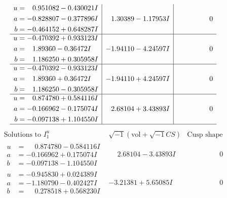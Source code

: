 \documentclass[1p]{elsarticle_modified}
\theoremstyle{definition}
\newcommand{\I}{\sqrt{-1}}
\begin{document}
$$\begin{array}{c|c|c}
\begin{aligned}
u &= \phantom{-}0.951082 - 0.430021 I \\
a &= -0.828807 - 0.377896 I \\
b &= -0.464152 + 0.648287 I\end{aligned}
 & \phantom{-}1.30389 - 1.17953 I & \phantom{-0.000000 } 0 \\ \hline\begin{aligned}
u &= -0.470392 + 0.933123 I \\
a &= \phantom{-}1.89360 - 0.36472 I \\
b &= \phantom{-}1.186250 + 0.305958 I\end{aligned}
 & -1.94110 - 4.24597 I & \phantom{-0.000000 } 0 \\ \hline\begin{aligned}
u &= -0.470392 - 0.933123 I \\
a &= \phantom{-}1.89360 + 0.36472 I \\
b &= \phantom{-}1.186250 - 0.305958 I\end{aligned}
 & -1.94110 + 4.24597 I & \phantom{-0.000000 } 0 \\ \hline\begin{aligned}
u &= \phantom{-}0.874780 + 0.584116 I \\
a &= -0.166962 - 0.175074 I \\
b &= -0.097138 + 1.104550 I\end{aligned}
 & \phantom{-}2.68104 + 3.43893 I & \phantom{-0.000000 } 0\\
 \hline 
 \end{array}$$\newpage$$\begin{array}{c|c|c}  
\text{Solutions to }I^u_{1}& \I (\text{vol} + \sqrt{-1}CS) & \text{Cusp shape}\\
 \hline 
\begin{aligned}
u &= \phantom{-}0.874780 - 0.584116 I \\
a &= -0.166962 + 0.175074 I \\
b &= -0.097138 - 1.104550 I\end{aligned}
 & \phantom{-}2.68104 - 3.43893 I & \phantom{-0.000000 } 0 \\ \hline\begin{aligned}
u &= -0.945830 + 0.024389 I \\
a &= -1.180790 - 0.402427 I \\
b &= \phantom{-}0.278518 + 0.568230 I\end{aligned}
 & -3.21381 + 5.65085 I & \phantom{-0.000000 } 0 \\ \hline\begin{aligned}

\end{aligned}
\end{array}$$
\end{document}
